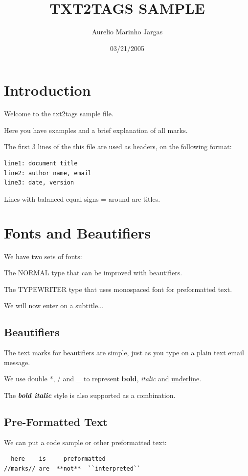\documentclass[11pt,a4paper]{article}
\title{TXT2TAGS SAMPLE}
\author{Aurelio Marinho Jargas}
\begin{document}
\date{03/21/2005}
\maketitle
\clearpage


\section*{Introduction}
Welcome to the txt2tags sample file.

Here you have examples and a brief explanation of all
marks.

The first 3 lines of the this file are used as headers,
on the following format:

\begin{verbatim}
line1: document title
line2: author name, email
line3: date, version
\end{verbatim}

Lines with balanced equal signs = around are titles.


\section*{Fonts and Beautifiers}
We have two sets of fonts:

The NORMAL type that can be improved with beautifiers.

The TYPEWRITER type that uses monospaced font for
preformatted text.

We will now enter on a subtitle...

\subsection*{Beautifiers}
The text marks for beautifiers are simple, just as you
type on a plain text email message.

We use double *, / and \_ to represent \textbf{bold},
\textit{italic} and \underline{underline}.

The \textbf{\textit{bold italic}} style is also supported as a
combination.

\subsection*{Pre-Formatted Text}
We can put a code sample or other preformatted text:

\begin{verbatim}
  here    is     preformatted
//marks// are  **not**  ``interpreted``
\end{verbatim}
\end{document}
